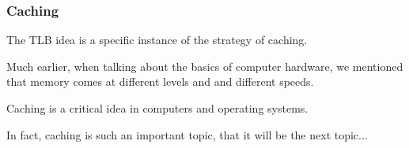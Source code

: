 \begin{frame}
\frametitle{Caching}

The TLB idea is a specific instance of the strategy of caching. 

Much earlier, when talking about the basics of computer hardware, we mentioned that memory comes at different levels and and different speeds. 

Caching is a critical idea in computers and operating systems. 

In fact, caching is such an important topic, that it will be the next topic...

\end{frame}



